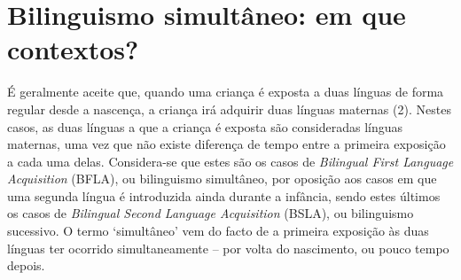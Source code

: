 \documentclass[output=paper]{LSP/langsci}
\begin{document}
\section{Bilinguismo simultâneo: em que contextos?}%
\label{sec:almeida_bilinguismo_simul}

É geralmente aceite que, quando uma criança é exposta a duas línguas de forma regular desde a nascença, a criança irá adquirir duas línguas maternas (2). Nestes casos, as duas línguas a que a criança é exposta são consideradas línguas maternas, uma vez que não existe diferença de tempo entre a primeira exposição a cada uma delas. Considera-se que estes são os casos de \textit{Bilingual First Language Acquisition} (BFLA), ou bilinguismo simultâneo, por oposição aos casos em que uma segunda língua é introduzida ainda durante a infância, sendo estes últimos os casos de \textit{Bilingual Second Language Acquisition} (BSLA), ou bilinguismo sucessivo. O termo ‘simultâneo’ vem do facto de a primeira exposição às duas línguas ter ocorrido simultaneamente -- por volta do nascimento, ou pouco tempo depois. 
\end{document}
